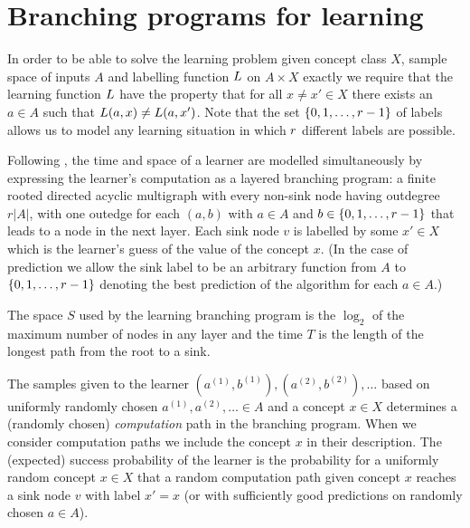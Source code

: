 \section{Branching programs for learning}

In order to be able to solve the learning problem given concept class $X$, 
sample space of inputs
$A$ and labelling function $L$ on $A\times X$ exactly we require that the
learning function $L$ have the property that for all $x\ne x'\in X$ there exists
an $a\in A$ such that $L(a,x)\ne L(a,x')$.
Note that the set $\{0,1,\ldots,r-1\}$ of labels allows us to model
any learning situation in which $r$ different labels are possible.

Following \cite{DBLP:conf/focs/Raz16}, the time and space of a
learner are modelled
simultaneously by expressing the learner's computation as a layered
branching program: a finite rooted directed acyclic multigraph with every
non-sink
node having outdegree $r|A|$, with one outedge for each $(a,b)$ with $a\in A$
and $b\in \{0,1,\ldots, r-1\}$ that leads to a node in the next layer.   
Each sink node $v$ is labelled by some $x'\in X$ which is the learner's guess
of the value of the concept $x$. (In the case of prediction we allow the
sink label to be an arbitrary function from $A$ to $\{0,1,\ldots,r-1\}$
denoting the best prediction of the algorithm for each $a\in A$.)

The space $S$ used by the learning branching program is the $\log_2$ of the
maximum number of nodes in any layer and the time $T$ is the length of the
longest path from the root to a sink.

\begin{sloppypar}
The samples given to the learner $(a^{(1)},b^{(1)}),(a^{(2)},b^{(2)}),\ldots$
based on uniformly randomly chosen $a^{(1)},a^{(2)},\ldots \in A$ and a concept
$x\in X$
determines a (randomly chosen) {\em computation} path in the branching program.
When we consider computation paths we include the concept $x$ in their
description.
The (expected) success probability of the learner is the probability for a
uniformly random concept $x\in X$ that a random computation path given concept $x$
reaches a sink node $v$ with label $x'=x$ (or with sufficiently good predictions
on randomly chosen $a\in A$).  
\end{sloppypar}

